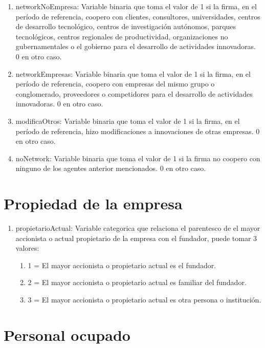 \documentclass[12pt,a4paper]{article}
\begin{document}
\begin{enumerate}
	\item networkNoEmpresa: Variable binaria que toma el valor de 1 si la firma, en el período de referencia, coopero con clientes, consultores, universidades, centros de desarrollo tecnológico, centros de investigación autónomos, parques tecnológicos, centros regionales de productividad, organizaciones no gubernamentales o el gobierno para el desarrollo de actividades innovadoras. 0 en otro caso.
	\item networkEmpresas: Variable binaria que toma el valor de 1 si la firma, en el período de referencia, coopero con empresas del mismo grupo o conglomerado, proveedores o competidores para el desarrollo de actividades innovadoras. 0 en otro caso.
	\item modificaOtros: Variable binaria que toma el valor de 1 si la firma, en el período de referencia, hizo modificaciones a innovaciones de otras empresas. 0 en otro caso.
	\item noNetwork:  Variable binaria que toma el valor de 1 si la firma no coopero con ninguno de los agentes anterior mencionados. 0 en otro caso.
\end{enumerate}

\section{Propiedad de la empresa}

\begin{enumerate}
	\item propietarioActual: Variable categorica que relaciona el parentesco de el mayor accionista o actual propietario de la empresa con el fundador, puede tomar 3 valores:
		 \begin{enumerate}
		 	\item 1 = El mayor accionista o propietario actual es el fundador.
		 	\item 2 = El mayor accionista o propietario actual es familiar del fundador.
		 	\item 3 = El mayor accionista o propietario actual es otra persona o institución.
		 \end{enumerate}
\end{enumerate}

\section{Personal ocupado}
\end{document}

